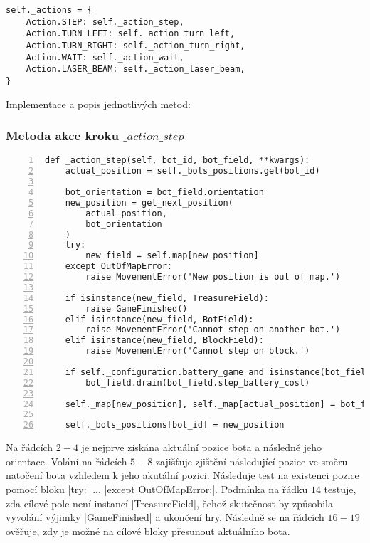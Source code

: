 \begin{lstlisting}[caption={Slovník akcí ve třídě $Game$},label={lst:game-actions}]
self._actions = {
    Action.STEP: self._action_step,
    Action.TURN_LEFT: self._action_turn_left,
    Action.TURN_RIGHT: self._action_turn_right,
    Action.WAIT: self._action_wait,
    Action.LASER_BEAM: self._action_laser_beam,
}	
\end{lstlisting}
Implementace a popis jednotlivých metod:

\subsubsection{Metoda akce kroku $\_action\_step$}

\begin{lstlisting}[caption={Metoda $Game.\_action\_step$},label={lst:game-action-step},numbers=left]
def _action_step(self, bot_id, bot_field, **kwargs):
    actual_position = self._bots_positions.get(bot_id)

    bot_orientation = bot_field.orientation
    new_position = get_next_position(
        actual_position,
        bot_orientation
    )
    try:
        new_field = self.map[new_position]
    except OutOfMapError:
        raise MovementError('New position is out of map.')

    if isinstance(new_field, TreasureField):
        raise GameFinished()
    elif isinstance(new_field, BotField):
        raise MovementError('Cannot step on another bot.')
    elif isinstance(new_field, BlockField):
        raise MovementError('Cannot step on block.')

    if self._configuration.battery_game and isinstance(bot_field, LaserBatteryBotField):
        bot_field.drain(bot_field.step_battery_cost)

    self._map[new_position], self._map[actual_position] = bot_field, new_field

    self._bots_positions[bot_id] = new_position
\end{lstlisting}

Na řádcích $2-4$ je nejprve získána aktuální pozice bota a následně jeho orientace. Volání na řádcích $5-8$ zajišťuje zjištění následující pozice ve směru natočení bota vzhledem k jeho akutální pozici. Následuje test na existenci pozice pomocí bloku \ic|try:| $...$ \ic|except OutOfMapError:|. Podmínka na řádku $14$ testuje, zda cílové pole není instancí \ic|TreasureField|, čehož skutečnost by způsobila vyvolání výjimky \ic|GameFinished| a ukončení hry. Následně se na řádcích $16-19$ ověřuje, zdy je možné na cílové bloky přesunout aktuálního bota.

